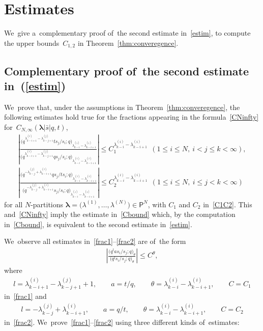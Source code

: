 \documentclass[11pt]{article}
\numberwithin{equation}{section}
\newcommand{\vlam}{\boldsymbol{\lambda}}
\newcommand{\bs}{\bar{s}}
\begin{document}
\setcounter{section}{1}
\setcounter{subsection}{2}
\setcounter{subsubsection}{0}
\setcounter{Theorem}{0}
\setcounter{equation}{2}
\section{Estimates}\label{app:estim}
{\sloppy
We~give a~complementary proof of~the second estimate in~\eqref{estim}, to compute the upper bounds~$C_{1,2}$ in Theorem~\ref{thm:converegence}.

}

\subsection[Complementary proof of~the second estimate in (3.13)]{Complementary proof of~the second estimate in~(\ref{estim})}
\label{app:proofestim}
We~prove that, under the assumptions in Theorem~\ref{thm:converegence}, the following estimates hold true for the fractions appearing in the formula~\eqref{CNinfty} for~$C_{N,\infty}(\vlam|\bs|q,t)$,
\begin{gather}
\label{frac1}
\left|\frac{\big(q^{\lambda^{(i)}_{k-i+1} - \lambda^{(j)}_{k-j+1}}ts_{j}/s_i;q\big)_{\lambda^{(i)}_{k-i}-\lambda^{(i)}_{k-i+1}}}{\big(q^{\lambda^{(i)}_{k-i+1} - \lambda^{(j)}_{k-j+1}}qs_{j}/s_i;q\big)_{\lambda^{(i)}_{k-i}-\lambda^{(i)}_{k-i+1}}}\right|\leq C_1^{\lambda^{(i)}_{k-i}-\lambda^{(i)}_{k-i+1}} \ \ (1\leq i\leq N,\ i<j\leq k<\infty) ,\!\!\!
\\
\label{frac2}
\left| \frac{\big(q^{-\lambda^{(j)}_{k-j}+\lambda^{(i)}_{k-i+1}}qs_{j}/ts_i ;q\big)_{\lambda^{(i)}_{k-i}-\lambda^{(i)}_{k-i+1}}}{\big(q^{-\lambda^{(j)}_{k-j}+\lambda^{(i)}_{k-i+1}}s_{j}/s_i ;q\big)_{\lambda^{(i)}_{k-i}-\lambda^{(i)}_{k-i+1}}} \right| \leq C_2^{\lambda^{(i)}_{k-i}-\lambda^{(i)}_{k-i+1}} \ \
(1\leq i\leq N,\ i\leq j< k<\infty)\!\!
\end{gather}
for all $N$-partitions $\vlam=\big(\lambda^{(1)},\dots,\lambda^{(N)}\big)\in\mathsf{P}^N$, with $C_1$ and $C_2$ in~\eqref{C1C2}.
This and~\eqref{CNinfty} imply the estimate in~\eqref{Cbound} which, by the computation in~\eqref{Cbound}, is equivalent to the second estimate in~\eqref{estim}.

We~observe all estimates in~\eqref{frac1}--\eqref{frac2} are of~the form
\begin{gather*}
\left|\frac{\big(q^{l}as_i/s_j;q\big)_\theta}{\big(q^l s_i/s_j;q\big)_\theta}\right|\leq C^\theta,
\end{gather*}
where
\begin{gather}
\label{first}
l= \lambda^{(i)}_{k-i+1} - \lambda^{(j)}_{k-j+1}+1,\qquad
a=t/q,\qquad
\theta= \lambda^{(i)}_{k-i}-\lambda^{(i)}_{k-i+1},\qquad
C=C_1
\end{gather}
in~\eqref{frac1} and
\begin{gather}
\label{second}
l=-\lambda^{(j)}_{k-j}+\lambda^{(i)}_{k-i+1},\qquad
a=q/t,\qquad
\theta= \lambda^{(i)}_{k-i}-\lambda^{(i)}_{k-i+1},\qquad
C=C_2
\end{gather}
in~\eqref{frac2}. We~prove~\eqref{frac1}--\eqref{frac2} using three different kinds of~estimates:
\end{document}
